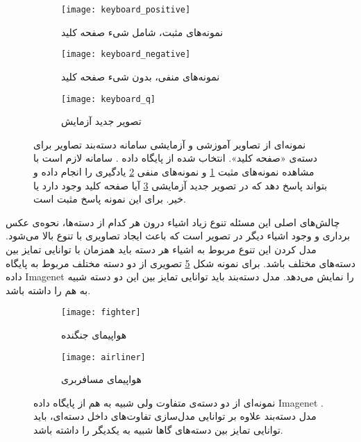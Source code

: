 \documentclass[11pt]{article}
\begin{document}
\begin{figure}[b!]
	\centering
	\begin{subfigure}[h]{0.5\textwidth}
		\texttt{[image: keyboard\_positive]}
		\caption{نمونه‌های مثبت، شامل شی‌ء صفحه کلید}
		\label{fig:intro:img_class_data:train_pos}
	\end{subfigure}
	\begin{subfigure}[h]{0.5\textwidth}
		\texttt{[image: keyboard\_negative]}
		\caption{نمونه‌های منفی، بدون شی‌ء صفحه کلید}
		\label{fig:intro:img_class_data:train_neg}
	\end{subfigure}
	\begin{subfigure}[h]{0.5\textwidth}
		\centering
		\texttt{[image: keyboard\_q]}
		\caption{تصویر جدید آزمایش}
		\label{fig:intro:img_class_data:query}
	\end{subfigure}
 
	\caption{نمونه‌ای از تصاویر آموزشی و آزمایشی سامانه دسته‌بند تصاویر برای دسته‌ی «صفحه کلید». انتخاب شده از پایگاه داده
 \cite{caltech256}.
			سامانه لازم است با مشاهده نمونه‌های مثبت \ref{fig:intro:img_class_data:train_pos} و نمونه‌های منفی \ref{fig:intro:img_class_data:train_neg} یادگیری را انجام داده و بتواند پاسخ دهد که در تصویر جدید آزمایشی \ref{fig:intro:img_class_data:query} آیا صفحه کلید وجود دارد یا خیر. برای این نمونه پاسخ مثبت است.
			}
	\label{fig:intro:img_class_data}
\end{figure}
چالش‌های اصلی این مسئله تنوع زیاد اشیاء درون هر کدام از دسته‌ها، نحوه‌ی عکس برداری و وجود اشیاء دیگر در تصویر است که باعث ایجاد تصاویری با تنوع بالا می‌شود. مدل کردن این تنوع مربوط به اشیاء هر دسته باید همزمان با توانایی تمایز بین دسته‌های مختلف باشد. برای نمونه شکل
\ref{fig:intro:img_class_discrim}
تصویری از دو دسته مختلف مربوط به پایگاه داده
Imagenet \cite{imagenet}
را نمایش می‌دهد. مدل دسته‌بند باید توانایی تمایز بین این دو دسته شبیه به هم را داشته باشد.

\begin{figure}[t]
	\centering
	\begin{subfigure}[h]{0.35\textwidth}
		\centering
		\texttt{[image: fighter]}
		\caption{هواپیمای جنگنده}
	\end{subfigure}
	\begin{subfigure}[h]{0.35\textwidth}
		\centering
		\texttt{[image: airliner]}
		\caption{هواپیمای مسافربری}
	\end{subfigure}
	\caption{نمونه‌ای از دو دسته‌ی متفاوت ولی شبیه به هم از پایگاه داده
Imagenet \cite{imagenet}.
مدل دسته‌بند علاوه بر توانایی مدل‌سازی تفاوت‌های داخل دسته‌ای، باید توانایی تمایز بین دسته‌های گاها شبیه به یکدیگر را داشته باشد.
}
	\label{fig:intro:img_class_discrim}
\end{figure}
\end{document}
